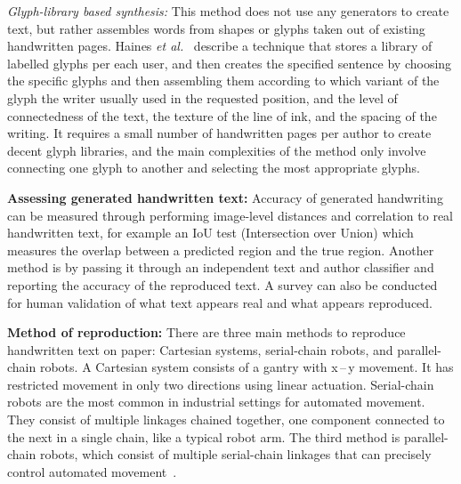 \emph{Glyph-library based synthesis:} This method does not use any generators to create text, but rather assembles words from shapes or glyphs taken out of existing handwritten pages. Haines \emph{et al.}~\cite{haines2016} describe a technique that stores a library of labelled glyphs per each user, and then creates the specified sentence by choosing the specific glyphs and then assembling them according to which variant of the glyph the writer usually used in the requested position, and the level of connectedness of the text, the texture of the line of ink, and the spacing of the writing. It requires a small number of handwritten pages per author to create decent glyph libraries, and the main complexities of the method only involve connecting one glyph to another and selecting the most appropriate glyphs.

\textbf{Assessing generated handwritten text:} Accuracy of generated handwriting can be measured through performing image-level distances and correlation to real handwritten text, for example an IoU test (Intersection over Union) which measures the overlap between a predicted region and the true region. Another method is by passing it through an independent text and author classifier and reporting the accuracy of the reproduced text. A survey can also be conducted for human validation of what text appears real and what appears reproduced.

\textbf{Method of reproduction:} There are three main methods to reproduce handwritten text on paper: Cartesian systems, serial-chain robots, and parallel-chain robots. A Cartesian system consists of a gantry with x\,--\,y movement. It has restricted movement in only two directions using linear actuation. Serial-chain robots are the most common in industrial settings for automated movement. They consist of multiple linkages chained together, one component connected to the next in a single chain, like a typical robot arm. The third method is parallel-chain robots, which consist of multiple serial-chain linkages that can precisely control automated movement~\cite{teikari2016}.

